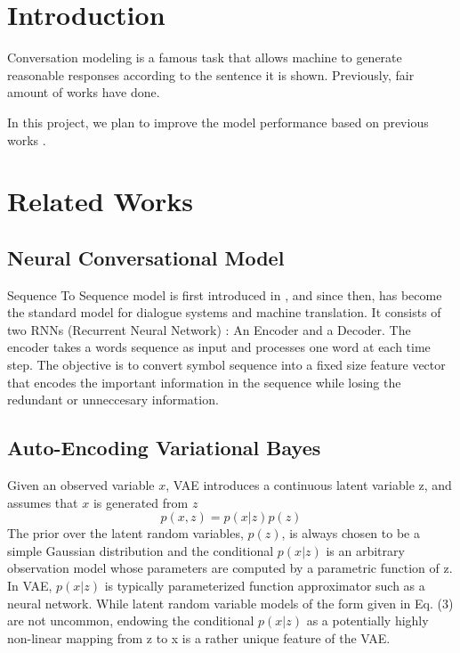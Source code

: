 \documentclass{article}
\begin{document}
\section{Introduction}
Conversation modeling is a famous task that allows machine to generate reasonable responses according to the sentence it is shown. Previously, fair amount of works have done.

In this project, we plan to improve the model performance based on previous works .




\section{Related Works}

\subsection{Neural Conversational Model}

Sequence To Sequence model is first introduced in \cite{seq2seq}, and since then, has become the standard model for dialogue systems and machine translation. It consists of two RNNs (Recurrent Neural Network) : An Encoder and a Decoder. The encoder takes a words sequence as input and processes one word at each time step. The objective is to convert symbol sequence into a fixed size feature vector that encodes the important information in the sequence while losing the redundant or unneccesary information.



\cite{ncm}
\cite{seq2seq}

\subsection{Auto-Encoding Variational Bayes}
\cite{vae}

Given an observed variable $x$, VAE introduces a continuous latent variable z, and assumes that $x$ is generated from $z$
$$p(x,z) = p(x|z)p(z)$$
The prior over the latent random variables, $p(z)$, is always chosen to be a simple Gaussian distribution and the conditional $p(x|z)$ is an arbitrary observation model whose parameters are computed by a parametric function of z. 
In VAE, $p(x|z)$ is typically parameterized function approximator such as a neural network. While latent random variable models of the form given in Eq. (3) are not uncommon, endowing the conditional $p(x|z)$ as a potentially highly non-linear mapping from z to x is a rather unique feature of the VAE.
\end{document}
